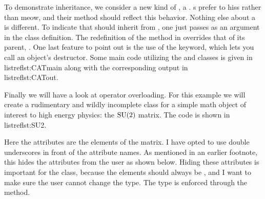 \begin{code*}
\caption{Main code using the  and  classes.}
\label{lst:CATmain}
\end{code*}
\begin{code*}
\caption{Output from the code of \\listref{lst:CATmain}.}
\label{lst:CATout}
\end{code*}

To demonstrate inheritance, we consider a new kind of , a
. s prefer to hiss rather than meow, and
their  method should reflect this behavior. Nothing else
about a  is different. To indicate that 
should inherit from , one just passes  as an argument
in the class definition.
The redefinition of the  method
in  overrides that of its parent, . One last
feature to point out is the use of the  keyword, which lets you
call an object's destructor.
Some main code utilizing the  and  classes
is given in \\listref{lst:CATmain} along with the
corresponding output in \\listref{lst:CATout}.

Finally we will have a look at operator overloading. For this example we
will create a rudimentary and wildly incomplete class for a simple math 
object of interest to high energy physics: the $\SU(2)$ matrix.
The code is shown in \\listref{lst:SU2}.

\begin{code*}
\caption{Example $\SU(2)$ matrix class.}
\label{lst:SU2}
\end{code*}

Here the attributes are the elements of the matrix. 
I have opted to use double underscores \ff{\_\_} in front of
the attribute names. As mentioned in an earlier footnote, this hides the
attributes from the user as shown below.
Hiding these attributes is important for the  class, because the
elements should always be , and I want to make sure the
user cannot change the type. The  type is
enforced through the  method.

